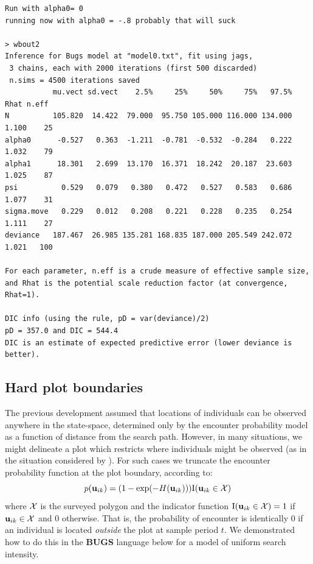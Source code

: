 \begin{verbatim}
Run with alpha0= 0
running now with alpha0 = -.8 probably that will suck

> wbout2
Inference for Bugs model at "model0.txt", fit using jags,
 3 chains, each with 2000 iterations (first 500 discarded)
 n.sims = 4500 iterations saved
           mu.vect sd.vect    2.5%     25%     50%     75%   97.5%  Rhat n.eff
N          105.820  14.422  79.000  95.750 105.000 116.000 134.000 1.100    25
alpha0      -0.527   0.363  -1.211  -0.781  -0.532  -0.284   0.222 1.032    79
alpha1      18.301   2.699  13.170  16.371  18.242  20.187  23.603 1.025    87
psi          0.529   0.079   0.380   0.472   0.527   0.583   0.686 1.077    31
sigma.move   0.229   0.012   0.208   0.221   0.228   0.235   0.254 1.111    27
deviance   187.467  26.985 135.281 168.835 187.000 205.549 242.072 1.021   100

For each parameter, n.eff is a crude measure of effective sample size,
and Rhat is the potential scale reduction factor (at convergence, Rhat=1).

DIC info (using the rule, pD = var(deviance)/2)
pD = 357.0 and DIC = 544.4
DIC is an estimate of expected predictive error (lower deviance is better).
\end{verbatim}




\subsection{Hard plot boundaries}

The previous development assumed that locations of individuals can be
observed anywhere in the state-space, determined only by the encounter
probability model as a function of distance from the search path.
However, in many situations, we might delineate a
plot which restricts where individuals might be observed (as in the
situation considered by \citet{royle_young:2008}).  For such cases we
truncate the encounter probability function at the plot boundary,
according to:
\begin{equation}
p({\bf u}_{ik}) = (1- \exp(-H({\bf u}_{ik}))) \mbox{I}({\bf u}_{ik} \in {\cal X})
\label{search-encounter.eq.hardplot}
\end{equation}
where ${\cal X}$ is the surveyed polygon and the indicator function
$\mbox{I}({\bf u}_{ik} \in {\cal X}) = 1$ if ${\bf u}_{ik} \in {\cal
  X}$ and 0 otherwise.  That is, the probability of encounter is
identically 0 if an individual is located {\it outside} the plot at
sample period $t$.  We demonstrated how to do this in the {\bf BUGS}
language below for a model of uniform search intensity.


